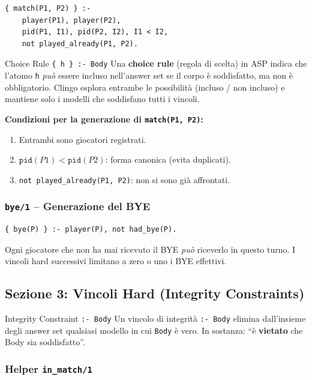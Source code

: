 \documentclass[12pt,a4paper]{article}
\begin{document}
\begin{lstlisting}
{ match(P1, P2) } :-
    player(P1), player(P2),
    pid(P1, I1), pid(P2, I2), I1 < I2,
    not played_already(P1, P2).
\end{lstlisting}

\begin{defbox}{Choice Rule \texttt{\{ h \} :- Body}}
Una \textbf{choice rule} (regola di scelta) in ASP indica che l'atomo \texttt{h}
\emph{può} essere incluso nell'answer set se il corpo è soddisfatto,
ma non è obbligatorio. Clingo esplora entrambe le possibilità (incluso / non incluso)
e mantiene solo i modelli che soddisfano tutti i vincoli.
\end{defbox}

\textbf{Condizioni per la generazione di \texttt{match(P1, P2)}:}
\begin{enumerate}[noitemsep]
  \item Entrambi sono giocatori registrati.
  \item $\texttt{pid}(P1) < \texttt{pid}(P2)$: forma canonica (evita duplicati).
  \item \texttt{not played\_already(P1, P2)}: non si sono già affrontati.
\end{enumerate}

\subsubsection{\texttt{bye/1} -- Generazione del BYE}

\begin{lstlisting}
{ bye(P) } :- player(P), not had_bye(P).
\end{lstlisting}

Ogni giocatore che non ha mai ricevuto il BYE \emph{può} riceverlo in questo
turno. I vincoli hard successivi limitano a zero o uno i BYE effettivi.

\subsection{Sezione 3: Vincoli Hard (Integrity Constraints)}

\begin{defbox}{Integrity Constraint \texttt{:- Body}}
Un vincolo di integrità \texttt{:- Body} elimina dall'insieme degli answer set
qualsiasi modello in cui \texttt{Body} è vero. In sostanza: ``è
\textbf{vietato} che Body sia soddisfatto''.
\end{defbox}

\subsubsection{Helper \texttt{in\_match/1}}
\end{document}
